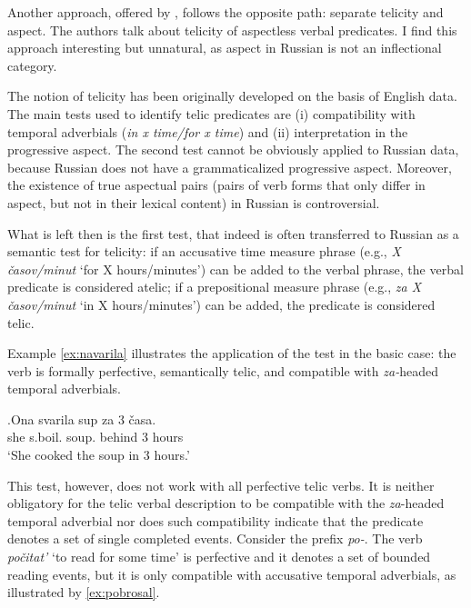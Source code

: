 Another approach, offered by \citet{PaduchevaPentus:08}, follows the opposite path: separate telicity and aspect. The authors talk about telicity of aspectless verbal predicates. I find this approach interesting but unnatural, as aspect in Russian is not an inflectional category. 

The notion of telicity has been originally developed on the basis of English data. The main tests used to identify telic predicates are (i) compatibility with temporal adverbials (\textit{in x time/for x time}) and (ii) interpretation in the progressive aspect. The second test cannot be obviously applied to Russian data, because Russian does not have a grammaticalized progressive aspect. Moreover, the existence of true aspectual pairs (pairs of verb forms that only differ in aspect, but not in their lexical content) in Russian is controversial.

What is left then is the first test, that indeed is often transferred to Russian as a semantic test for telicity: if an accusative time measure phrase (e.g., \textit{X \v{c}asov/minut} `for X hours/minutes') can be added to the verbal phrase, the verbal predicate is considered atelic; if a prepositional measure phrase (e.g., \textit{za X \v{c}asov/minut} `in X hours/minutes') can be added, the predicate is considered telic.

Example \ref{ex:navarila} illustrates the application of the test in the basic case: the verb is formally perfective, semantically telic, and compatible with \textit{za-}headed temporal adverbials. 

\exg.\label{ex:navarila}Ona svarila\textsuperscript{\PF} sup za 3 \v{c}asa.\\
she s.boil. soup. behind 3 hours\\
\trans `She cooked the soup in 3 hours.'

This test, however, does not work with all perfective telic verbs. It is neither obligatory for the telic verbal description to be compatible with the \textit{za}-headed temporal adverbial nor does such compatibility indicate that the predicate denotes a set of single completed events. Consider the prefix \textit{po-}. The verb \textit{po\v{c}itat'}\textsuperscript{\PF} `to read for some time' is perfective and it denotes a set of bounded reading events, but it is only compatible with accusative temporal adverbials, as illustrated by \ref{ex:pobrosal}.

